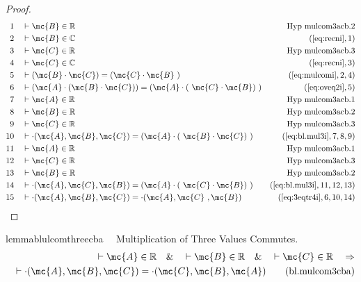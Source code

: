 \begin{proof}
\begin{align}
  1 &&  & \vdash \mc{B} \in
\mathbb{R}&\text{Hyp~mulcom3acb.2}\notag%
  \\ 2 &&  & \vdash \mc{B} \in \mathbb{C}&(\mbox{\ref{eq:recni}},1)\notag
  \\ 3 &&  & \vdash \mc{C} \in
\mathbb{R}&\text{Hyp~mulcom3acb.3}\notag%
  \\ 4 &&  & \vdash \mc{C} \in \mathbb{C}&(\mbox{\ref{eq:recni}},3)\notag
  \\ 5 &&  & \vdash ( \mc{B} \cdot \mc{C} ) = ( \mc{C} \cdot \mc{B}
     ~)&(\mbox{\ref{eq:mulcomi}},2,4)\notag
  \\ 6 &&  & \vdash ( \mc{A} \cdot ( \mc{B} \cdot \mc{C} ) ) = ( \mc{A} \cdot (
     ~\mc{C} \cdot \mc{B} )
     ~)&(\mbox{\ref{eq:oveq2i}},5)\notag
  \\ 7 &&  & \vdash \mc{A} \in
\mathbb{R}&\text{Hyp~mulcom3acb.1}\notag%
  \\ 8 &&  & \vdash \mc{B} \in
\mathbb{R}&\text{Hyp~mulcom3acb.2}\notag%
  \\ 9 &&  & \vdash \mc{C} \in
\mathbb{R}&\text{Hyp~mulcom3acb.3}\notag%
  \\ 10 &&  & \vdash \cdot( \mc{A} , \mc{B} , \mc{C} ) = ( \mc{A} \cdot (
     ~\mc{B} \cdot \mc{C} )
     ~)&(\mbox{\ref{eq:bl.mul3i}},7,8,9)\notag
  \\ 11 &&  & \vdash \mc{A} \in
\mathbb{R}&\text{Hyp~mulcom3acb.1}\notag%
  \\ 12 &&  & \vdash \mc{C} \in
\mathbb{R}&\text{Hyp~mulcom3acb.3}\notag%
  \\ 13 &&  & \vdash \mc{B} \in
\mathbb{R}&\text{Hyp~mulcom3acb.2}\notag%
  \\ 14 &&  & \vdash \cdot( \mc{A} , \mc{C} , \mc{B} ) = ( \mc{A} \cdot (
     ~\mc{C} \cdot \mc{B} )
     ~)&(\mbox{\ref{eq:bl.mul3i}},11,12,13)\notag
  \\ 15 &&  & \vdash \cdot( \mc{A} , \mc{B} , \mc{C} ) = \cdot( \mc{A} , \mc{C}
     ~, \mc{B} )&(\mbox{\ref{eq:3eqtr4i}},6,10,14)\notag
\end{align}
\end{proof}

\begin{restatable}{lemma}{blulcomthreecba}~~ Multiplication of Three Values
Commutes.
\begin{align}
\vdash \mc{A} \in \mathbb{R}\quad\&\quad \vdash \mc{B} \in
    \mathbb{R}\quad\&\quad \vdash \mc{C} \in \mathbb{R}\quad\Rightarrow \notag \\ 
	\quad
    \vdash \cdot( \mc{A} , \mc{B} , \mc{C} ) = \cdot( \mc{C} , \mc{B} , \mc{A}
    )\label{eq:bl.mulcom3cba}\tag{bl.mulcom3cba}
\end{align}
\end{restatable}

